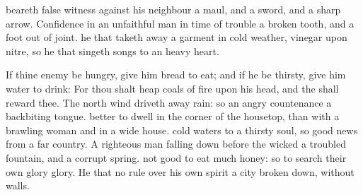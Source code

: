 {beareth
false
witness against his
neighbour
{} a
maul, and a
sword, and a
sharp
arrow.
Confidence in an unfaithful
man in
time of
trouble
{} a
broken
tooth, and a
foot out of
joint.
 he that taketh
away a
garment in
cold
weather,
{}
vinegar upon
nitre, so
{} he that
singeth
songs to an
heavy
heart.
\par }{\PP {}If thine
enemy be
hungry, give him
bread to
eat; and if he be
thirsty, give him
water to
drink:
For thou shalt
heap coals of
fire upon his
head, and the
{} shall
reward thee.
The
north
wind driveth
away
rain: so
{} an
angry
countenance a
backbiting
tongue.
better to
dwell in the
corner of the
housetop, than with a
brawling
woman and in a
wide
house.
cold
waters to a
thirsty
soul, so
{}
good
news from a
far
country.
A
righteous man falling
down
before the
wicked
{} a
troubled
fountain, and a
corrupt
spring.
 not
good to
eat
much
honey: so
{} to
search their own
glory
{}
glory.
He that
{} no
rule over his own
spirit
{} a
city
{} broken
down,
{} without
walls.

}
